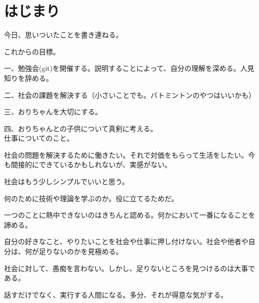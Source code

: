 \chapter{はじまり}
今日、思いついたことを書き連ねる。

これからの目標。

一、勉強会(git)を開催する。説明することによって、自分の理解を深める。人見知りを辞める。

二、社会の課題を解決する（小さいことでも。バトミントンのやつはいいかも）

三、おりちゃんを大切にする。

四、おりちゃんとの子供について真剣に考える。
\\


仕事についてのこと。

社会の問題を解決するために働きたい。それで対価をもらって生活をしたい。今も間接的にできているかもしれないが、実感がない。

社会はもう少しシンプルでいいと思う。

何のために技術や理論を学ぶのか。役に立てるためだ。

一つのことに熱中できないのはきちんと認める。何かにおいて一番になることを諦める。

自分の好きなこと、やりたいことを社会や仕事に押し付けない。社会や他者や自分は、何が足りないのかを見極める。

社会に対して、愚痴を言わない。しかし、足りないところを見つけるのは大事である。

話すだけでなく、実行する人間になる。多分、それが得意な気がする。

